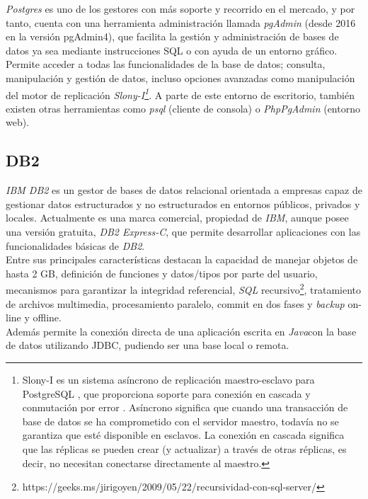 \documentclass{article}
\begin{document}
\emph{Postgres} es uno de los gestores con más soporte y recorrido en el mercado, y por tanto, cuenta con una herramienta administración llamada \emph{pgAdmin} (desde 2016 en la versión pgAdmin4), que facilita la gestión y administración de bases de datos ya sea mediante instrucciones SQL o con ayuda de un entorno gráfico. Permite acceder a todas las funcionalidades de la base de datos; consulta, manipulación y gestión de datos, incluso opciones avanzadas como manipulación del motor de replicación \emph{Slony-I\footnote {Slony-I es un sistema asíncrono de replicación maestro-esclavo para PostgreSQL , que proporciona soporte para conexión en cascada y conmutación por error . Asíncrono significa que cuando una transacción de base de datos se ha comprometido con el servidor maestro, todavía no se garantiza que esté disponible en esclavos. La conexión en cascada significa que las réplicas se pueden crear (y actualizar) a través de otras réplicas, es decir, no necesitan conectarse directamente al maestro.\cite{SLO:1}}}. A parte de este entorno de escritorio, también existen otras herramientas como \emph{psql} (cliente de consola) o \emph{PhpPgAdmin} (entorno web).\cite{PG:1}

\subsection{DB2}

\emph{IBM DB2} es un gestor de bases de datos relacional orientada a empresas capaz de gestionar datos estructurados y no estructurados en entornos públicos, privados y locales.\cite{DB2:1} Actualmente es una marca comercial, propiedad de \emph{IBM}, aunque posee una versión gratuita, \emph{DB2 Express-C}\cite{DB2:2}, que permite desarrollar aplicaciones con las funcionalidades básicas de \emph{DB2}.\\

Entre sus principales características destacan la capacidad de manejar objetos de hasta 2 GB, definición de funciones y datos/tipos por parte del usuario, mecanismos para garantizar la integridad referencial, \emph{SQL} recursivo\footnote{https://geeks.ms/jirigoyen/2009/05/22/recursividad-con-sql-server/}, tratamiento de archivos multimedia, procesamiento paralelo, commit en dos fases y \emph{backup} on-line y offline.\\
Además permite la conexión directa de una aplicación escrita en \emph{Java}con la base de datos utilizando JDBC,  pudiendo ser una base local o remota.\cite{DB2:3}\\
\end{document}
